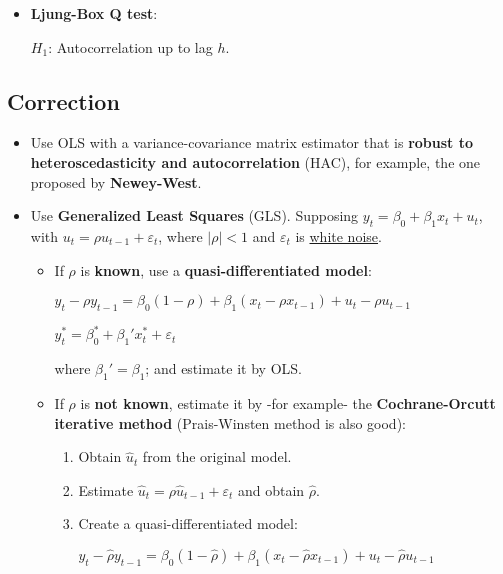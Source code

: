 \documentclass[10pt, a4paper, landscape]{article}
\begin{document}
\begin{multicols}{3}
\begin{itemize}[leftmargin=*]
	\item \textbf{Ljung-Box Q test}:

	\( H_{1} \): Autocorrelation up to lag \( h \).
\end{itemize}

\columnbreak

\subsection*{Correction}

\begin{itemize}[leftmargin=*]
	\item Use OLS with a variance-covariance matrix estimator that is \textbf{robust to heteroscedasticity and autocorrelation} (HAC), for example, the one proposed by \textbf{Newey-West}.
	\item Use \textbf{Generalized Least Squares} (GLS). Supposing \( y_{t} = \beta_{0} + \beta_{1} x_{t} + u_{t} \), with \( u_{t} = \rho u_{t - 1} + \varepsilon_{t} \), where \( \lvert \rho \rvert < 1 \) and \( \varepsilon_{t} \) is \underline{white noise}.
	\begin{itemize}[leftmargin=*]
		\item If \( \rho \) is \textbf{known}, use a \textbf{quasi-differentiated model}:
		\begin{center}
			\( y_{t} - \rho y_{t - 1}= \beta_{0} (1 - \rho) + \beta_{1} (x_{t} - \rho x_{t - 1}) + u_{t} - \rho u_{t - 1} \)

			\( y_{t}^{*} = \beta_{0}^{*} + \beta_{1}' x_{t}^{*} + \varepsilon_{t} \)
		\end{center}
		where \( \beta_{1}' = \beta_{1} \); and estimate it by OLS.
		\item If \( \rho \) is \textbf{not known}, estimate it by -for example- the \textbf{Cochrane-Orcutt iterative method} (Prais-Winsten method is also good):
		\begin{enumerate}[leftmargin=*]
			\item Obtain \( \hat{u}_{t} \) from the original model.
			\item Estimate \( \hat{u}_{t} = \rho \hat{u}_{t - 1} + \varepsilon_{t} \) and obtain \( \hat{\rho} \).
			\item Create a quasi-differentiated model:
			\begin{center}
				\( y_{t} - \hat{\rho}y_{t - 1} = \beta_{0} (1 - \hat{\rho}) + \beta_{1} (x_{t} - \hat{\rho} x_{t - 1}) + u_{t} - \hat{\rho}u_{t - 1} \)


\end{center}
\end{enumerate}
\end{itemize}
\end{itemize}
\end{multicols}
\end{document}
